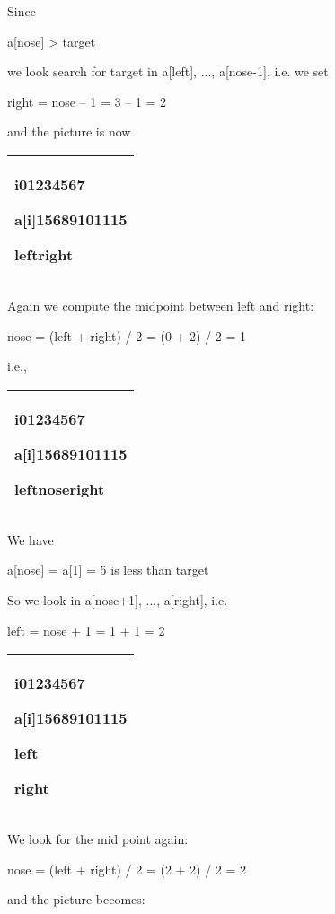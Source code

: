 \documentclass[
]{article}
\begin{document}
Since

a{[}nose{]} \textgreater{} target

we look search for target in a{[}left{]}, ..., a{[}nose-1{]}, i.e. we
set

right = nose -- 1 = 3 -- 1 = 2

and the picture is now

\begin{longtable}[]{@{}l@{}}
\toprule
\endhead
\begin{minipage}[t]{0.97\columnwidth}\raggedright
i01234567

a{[}i{]}15689101115

leftright\strut
\end{minipage}\tabularnewline
\bottomrule
\end{longtable}

Again we compute the midpoint between left and right:

nose = (left + right) / 2 = (0 + 2) / 2 = 1

i.e.,

\begin{longtable}[]{@{}l@{}}
\toprule
\endhead
\begin{minipage}[t]{0.97\columnwidth}\raggedright
i01234567

a{[}i{]}15689101115

leftnoseright\strut
\end{minipage}\tabularnewline
\bottomrule
\end{longtable}

We have

a{[}nose{]} = a{[}1{]} = 5 is less than target

So we look in a{[}nose+1{]}, ..., a{[}right{]}, i.e.

left = nose + 1 = 1 + 1 = 2

\begin{longtable}[]{@{}l@{}}
\toprule
\endhead
\begin{minipage}[t]{0.97\columnwidth}\raggedright
i01234567

a{[}i{]}15689101115

left

right\strut
\end{minipage}\tabularnewline
\bottomrule
\end{longtable}

We look for the mid point again:

nose = (left + right) / 2 = (2 + 2) / 2 = 2

and the picture becomes:
\end{document}
